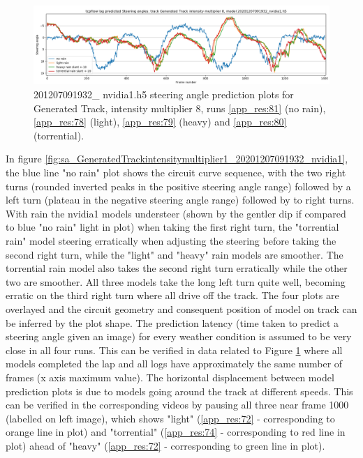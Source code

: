 \begin{figure}[h!]
 \centering 
 \includegraphics[width=\textwidth]{Figures/sa_GeneratedTrackintensitymultiplier8_20201207091932_nvidia1.h5.png}
 \caption{201207091932\_ nvidia1.h5 steering angle prediction plots for Generated Track, intensity multiplier 8, runs \ref{app_res:81} (no rain),  \ref{app_res:78} (light), \ref{app_res:79} (heavy) and \ref{app_res:80} (torrential).}
 \label{fig:sa_GeneratedTrackintensitymultiplier8_20201207091932_nvidia1} 
\end{figure}


In figure \ref{fig:sa_GeneratedTrackintensitymultiplier1_20201207091932_nvidia1}, the blue line "no rain" plot shows the circuit curve sequence, with the two right turns (rounded inverted peaks in the positive steering angle range) followed by a left turn (plateau in the negative steering angle range) followed by to right turns. With rain the nvidia1 models understeer (shown by the gentler dip if compared to blue "no rain" light in plot) when taking the first right turn, the "torrential rain" model steering erratically when adjusting the steering before taking the second right turn, while the "light" and "heavy" rain models are smoother. The torrential rain model also takes the second right turn erratically while the other two are smoother. All three models take the long left turn quite well, becoming erratic on the third right turn where all drive off the track. The four plots are overlayed and the circuit geometry and consequent position of model on track can be inferred by the plot shape. The prediction latency (time taken to predict a steering angle given an image) for every weather condition is assumed to be very close in all four runs. This can be verified in data related to Figure \ref{fig:sa_GeneratedTrackintensitymultiplier8_20201207091932_nvidia1} where all models completed the lap and all logs have approximately the same number of frames (x axis maximum value). The horizontal displacement between model prediction plots is due to models going around the track at different speeds. This can be verified in the corresponding videos by pausing all three near frame 1000 (labelled on left image), which shows "light" (\ref{app_res:72} - corresponding to orange line in plot) and "torrential" (\ref{app_res:74} - corresponding to red line in plot) ahead of "heavy" (\ref{app_res:72} - corresponding to green line in plot).

